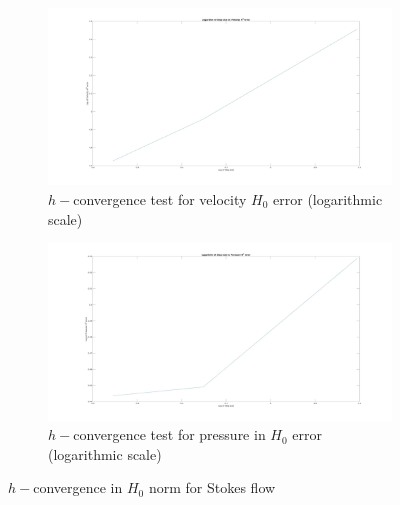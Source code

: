 \documentclass[a4paper,openany]{book}
\begin{document}
\begin{figure}
\begin{subfigure}{\textwidth}	
  \includegraphics[width=\linewidth]{h0_velocity_log_stokes.jpg}
  \caption{$h-$convergence test for velocity $H_0$ error (logarithmic scale)}
  \label{fig:vel_stoke_conv_log_h0}
\end{subfigure}
\begin{subfigure}{\textwidth}	
  \includegraphics[width=\linewidth]{h0_pressure_log_stokes.jpg}
  \caption{$h-$convergence test for pressure in $H_0$ error (logarithmic scale)}
  \label{fig:pre_stoke_conv_log_h0}
\end{subfigure}
\caption{$h-$convergence in $H_0$ norm for Stokes flow}
\label{fig:h0_stokes}
\end{figure}
\end{document}
